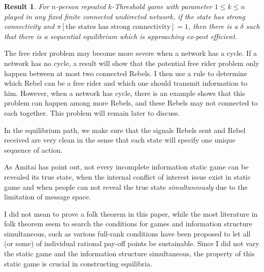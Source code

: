 \documentclass[12pt,letter]{article}
\newtheorem{result}{Result}
\theoremstyle{remark}
\theoremstyle{remark}
\theoremstyle{claim}
\begin{document}
\begin{result}
For $n$-person repeated $k$-Threshold game with parameter $1\leq k \leq n$ played in any fixed finite connected undirected network,
if the state has strong connectivity and $\pi[\text{the states has strong connectivity}]=1$, then there is a $\delta$ such that there is a sequential equilibrium which is approaching ex-post efficient.
\end{result}

The free rider problem may become more severe when a network has a cycle. If a network has no cycle, a result will show that the potential free rider problem only happen between at most two connected Rebels. I then use a rule to determine which Rebel can be a free rider and which one should transmit information to him. However, when a network has cycle, there is an example shows that this problem can happen among more Rebels, and these Rebels may not connected to each together. This problem will remain later to discuss.





 


 
In the equilibrium path, we make sure that the signals Rebels sent and Rebel received are very clean in the sense that each state will specify one unique sequence of action.




 



As Amitai has point out, not every incomplete information static game can be revealed its true state, when the internal conflict of interest issue exist in static game and when people can not reveal the true state \textit{simultaneously} due to the limitation of message space. 





 





 I did not mean to prove a folk theorem in this paper, while the most literature in folk theorem seem to search the conditions for games and information structure simultaneous, such as various full-rank conditions have been proposed to let all (or some) of individual rational pay-off points be sustainable. Since I did not vary the static game and the information structure simultaneous, the property of this static game is crucial in constructing equilibria.
\end{document}
